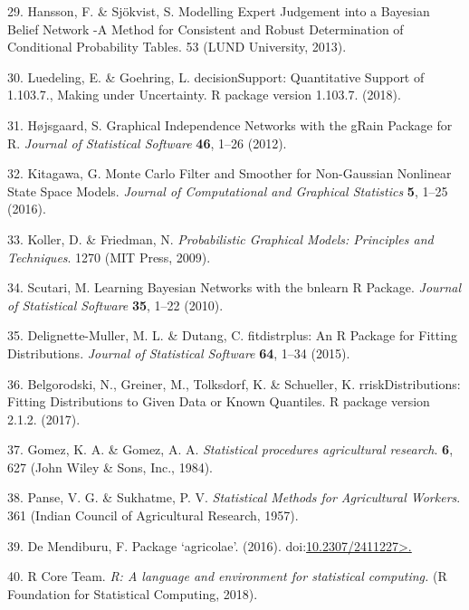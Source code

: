 \documentclass[12pt,oneside]{article}
\begin{document}
\leavevmode\hypertarget{ref-Hansson_and_Sjokvist_2013}{}%
29. Hansson, F. \& Sjökvist, S. Modelling Expert Judgement into a Bayesian Belief Network -A Method for Consistent and Robust Determination of Conditional Probability Tables. 53 (LUND University, 2013).

\leavevmode\hypertarget{ref-Luedeling_and_Goehring_2018}{}%
30. Luedeling, E. \& Goehring, L. decisionSupport: Quantitative Support of 1.103.7., Making under Uncertainty. R package version 1.103.7. (2018).

\leavevmode\hypertarget{ref-Hojsgaard_2012}{}%
31. Højsgaard, S. Graphical Independence Networks with the gRain Package for R. \emph{Journal of Statistical Software} \textbf{46}, 1--26 (2012).

\leavevmode\hypertarget{ref-Kitagawa_2016}{}%
32. Kitagawa, G. Monte Carlo Filter and Smoother for Non-Gaussian Nonlinear State Space Models. \emph{Journal of Computational and Graphical Statistics} \textbf{5}, 1--25 (2016).

\leavevmode\hypertarget{ref-Koller_and_Friedman_2009}{}%
33. Koller, D. \& Friedman, N. \emph{Probabilistic Graphical Models: Principles and Techniques}. 1270 (MIT Press, 2009).

\leavevmode\hypertarget{ref-Scutari_2010}{}%
34. Scutari, M. Learning Bayesian Networks with the bnlearn R Package. \emph{Journal of Statistical Software} \textbf{35}, 1--22 (2010).

\leavevmode\hypertarget{ref-Delignette-Muller_and_Dutang_2015}{}%
35. Delignette-Muller, M. L. \& Dutang, C. fitdistrplus: An R Package for Fitting Distributions. \emph{Journal of Statistical Software} \textbf{64}, 1--34 (2015).

\leavevmode\hypertarget{ref-Belgorodski_et_al_2017}{}%
36. Belgorodski, N., Greiner, M., Tolksdorf, K. \& Schueller, K. rriskDistributions: Fitting Distributions to Given Data or Known Quantiles. R package version 2.1.2. (2017).

\leavevmode\hypertarget{ref-Gomez_and_Gomez_1984}{}%
37. Gomez, K. A. \& Gomez, A. A. \emph{Statistical procedures agricultural research}. \textbf{6}, 627 (John Wiley \& Sons, Inc., 1984).

\leavevmode\hypertarget{ref-Panse_and_Sukhatme_1957}{}%
38. Panse, V. G. \& Sukhatme, P. V. \emph{Statistical Methods for Agricultural Workers}. 361 (Indian Council of Agricultural Research, 1957).

\leavevmode\hypertarget{ref-DeMendiburu_2016}{}%
39. De Mendiburu, F. Package `agricolae'. (2016). doi:\href{https://doi.org/10.2307/2411227\%3E.}{10.2307/2411227\textgreater.}

\leavevmode\hypertarget{ref-RCoreTeam_2018}{}%
40. R Core Team. \emph{R: A language and environment for statistical computing.} (R Foundation for Statistical Computing, 2018).
\end{document}
